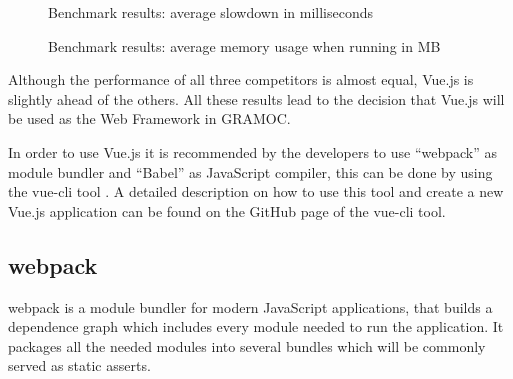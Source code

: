 \begin{figure}[H]
    \centering
    \caption{Benchmark results: average slowdown in milliseconds}
    \label{fig:slowdownresults}
\end{figure}

\begin{figure}[H]
    \centering
    \caption{Benchmark results: average memory usage when running in MB}
    \label{fig:memoryresults}
\end{figure}

Although the performance of all three competitors is almost equal, Vue.js is slightly ahead of the others. All these results lead to the decision that Vue.js will be used as the Web Framework in GRAMOC.

In order to use Vue.js it is recommended by the developers to use ``webpack''  as module bundler and ``Babel'' as JavaScript compiler, this can be done by using the vue-cli tool \autocite{webpack} \autocite{Babel} \autocite{vuecli}. A detailed description on how to use this tool and create a new Vue.js application can be found on the GitHub page of the vue-cli tool.

\subsection{webpack}
webpack is a module bundler for modern JavaScript applications, that builds a dependence graph which includes every module needed to run the application. It packages all the needed modules into several bundles which will be commonly served as static asserts.

